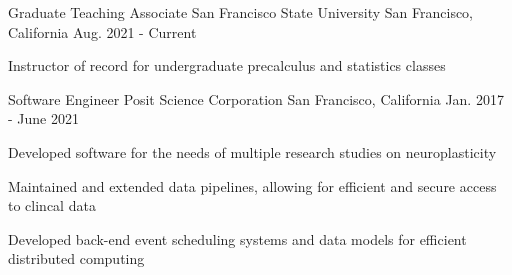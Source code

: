 \documentclass[../omelveny-cv]{subfiles}
\begin{document}
\begin{cventries}
    \cventry
    {Graduate Teaching Associate}
    {San Francisco State University}
    {San Francisco, California}
    {Aug. 2021 - Current}
    {
        \begin{cvitems}
            \item {Instructor of record for undergraduate precalculus and statistics classes}
        \end{cvitems}
    }

    \cventry
    {Software Engineer}
    {Posit Science Corporation}
    {San Francisco, California}
    {Jan. 2017 - June 2021}
    {
        \begin{cvitems}
            \item {Developed software for the needs of multiple research studies on neuroplasticity}
            \item {Maintained and extended data pipelines, allowing for efficient and secure access to clincal data}
            \item {Developed back-end event scheduling systems and data models for efficient distributed computing}
        \end{cvitems}
    }


\end{cventries}
\end{document}
